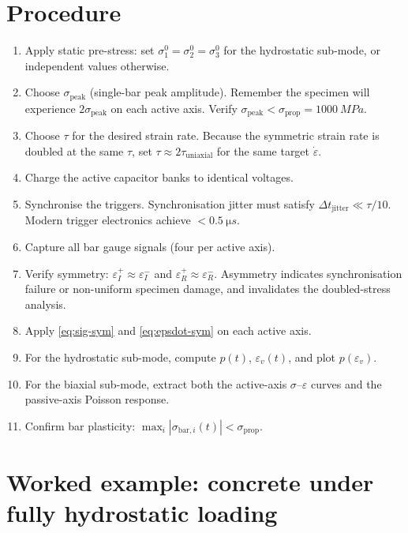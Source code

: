 \documentclass[11pt,a4paper,openany]{book}
\providecommand{\SI}[2]{\qty{#1}{#2}}
\theoremstyle{handbook}
\newcommand{\sig}{\sigma}
\newcommand{\eps}{\varepsilon}
\newcommand{\epsdot}{\dot\eps}
\newcommand{\sigprop}{\sig_{\text{prop}}}
\newcommand{\sigpeak}{\sig_{\text{peak}}}
\begin{document}
\section{Procedure}

\begin{stepbox}
\begin{enumerate}[leftmargin=*,itemsep=3pt]
  \item Apply static pre-stress: set $\sig_1^{0}=\sig_2^{0}=\sig_3^{0}$ for
        the hydrostatic sub-mode, or independent values otherwise.
  \item Choose $\sigpeak$ (single-bar peak amplitude). Remember the specimen
        will experience $2\sigpeak$ on each active axis. Verify
        $\sigpeak<\sigprop=\SI{1000}{MPa}$.
  \item Choose $\tau$ for the desired strain rate. Because the symmetric
        strain rate is doubled at the same $\tau$, set
        $\tau\approx 2\tau_{\text{uniaxial}}$ for the same target
        $\epsdot$.
  \item Charge the active capacitor banks to identical voltages.
  \item Synchronise the triggers. Synchronisation jitter must satisfy
        $\Delta t_{\text{jitter}}\ll\tau/10$. Modern trigger electronics
        achieve $<\SI{0.5}{\micro s}$.
  \item Capture all bar gauge signals (four per active axis).
  \item Verify symmetry: $\eps_I^{+}\approx\eps_I^{-}$ and
        $\eps_R^{+}\approx\eps_R^{-}$. Asymmetry indicates synchronisation
        failure or non-uniform specimen damage, and invalidates the
        doubled-stress analysis.
  \item Apply \eqref{eq:sig-sym} and \eqref{eq:epsdot-sym} on each active
        axis.
  \item For the hydrostatic sub-mode, compute $p(t)$, $\eps_v(t)$, and plot
        $p(\eps_v)$.
  \item For the biaxial sub-mode, extract both the active-axis
        $\sig$--$\eps$ curves and the passive-axis Poisson response.
  \item Confirm bar plasticity:
        $\max_i|\sig_{\text{bar},i}(t)|<\sigprop$.
\end{enumerate}
\end{stepbox}

\section{Worked example: concrete under fully hydrostatic loading}
\end{document}
